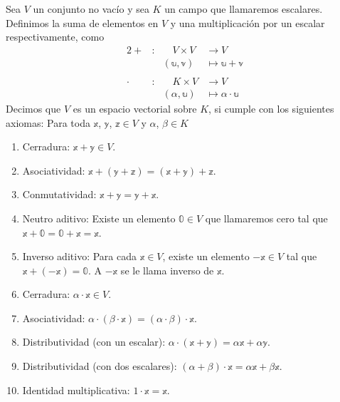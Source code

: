 \begin{definition}\label{definicion:espvec}
    Sea $V$ un conjunto no vacío y sea $K$ un campo que llamaremos escalares. Definimos la suma de elementos en $V$ y una multiplicación por un escalar respectivamente, como
    \begin{alignat*}{2}
        + &: & \quad V \times V & \longrightarrow V \\
        & & (\mathbb{u}, \mathbb{v}) & \longmapsto \mathbb{u} + \mathbb{v} \\
        & \\
        \cdot &: & \quad K \times V & \longrightarrow V \\
        & & (\alpha, \mathbb{u}) & \longmapsto \alpha \cdot \mathbb{u}
    \end{alignat*}
    Decimos que $V$ es un espacio vectorial sobre $K$, si cumple con los siguientes axiomas: Para toda $\mathbb{x}$, $\mathbb{y}$, $\mathbb{z} \in V$ y $\alpha$, $\beta \in K$
    \begin{enumerate}[label=\roman*)]
        \item Cerradura: $\mathbb{x} + \mathbb{y} \in V$.
        \item Asociatividad: $\mathbb{x} + (\mathbb{y} + \mathbb {z}) = (\mathbb{x} + \mathbb{y}) + \mathbb{z}$.\newpage
        \item Conmutatividad: $\mathbb{x} + \mathbb{y} = \mathbb{y} + \mathbb{x}$.
        \item Neutro aditivo: Existe un elemento $\mathbb{0} \in V$ que llamaremos cero tal que $\mathbb{x} + \mathbb{0} = \mathbb{0} + \mathbb{x} = \mathbb{x}$.
        \item Inverso aditivo: Para cada $\mathbb{x} \in V$, existe un elemento $-\mathbb{x} \in V$ tal que $\mathbb{x} + (-\mathbb{x}) = \mathbb{0}$. A $-\mathbb{x}$ se le llama inverso de $\mathbb{x}$.
        \item Cerradura: $\alpha \cdot \mathbb{x} \in V$.
        \item Asociatividad: $\alpha \cdot (\beta \cdot \mathbb{x}) = (\alpha \cdot \beta) \cdot \mathbb{x}$.
        \item Distributividad (con un escalar): $\alpha \cdot (\mathbb{x} + \mathbb{y}) = \alpha \mathbb{x} + \alpha \mathbb{y}$.
        \item Distributividad (con dos escalares): $(\alpha + \beta) \cdot \mathbb{x} = \alpha \mathbb{x} + \beta \mathbb{x}$.
        \item Identidad multiplicativa: $1 \cdot \mathbb{x} = \mathbb{x}$.
    \end{enumerate}
\end{definition}

